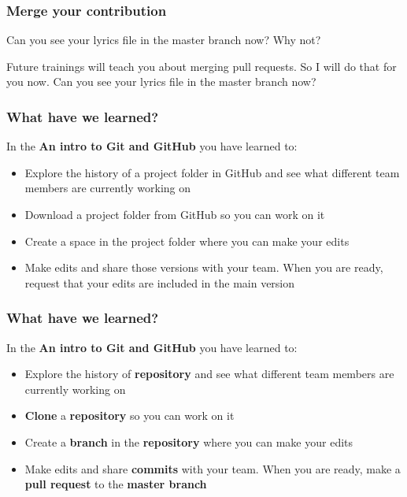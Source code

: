 \documentclass[aspectratio=169]{beamer} %
\begin{document}
\begin{frame}
\frametitle{Merge your contribution}

Can you see your lyrics file in the master branch now? Why not?

\vspace{.5cm}

Future trainings will teach you about merging pull requests. So I will do that for you now. Can you see your lyrics file in the master branch now?

\end{frame}



\begin{frame}
\frametitle{What have we learned?}
	
	In the \textbf{An intro to Git and GitHub} you have learned to:
	
	\begin{itemize}
		\item Explore the history of a project folder in GitHub and see what different team members are currently working on
		\item Download a project folder from GitHub so you can work on it
		\item Create a space in the project folder where you can make your edits
		\item Make edits and share those versions with your team. When you are ready, request that your edits are included in the main version
	\end{itemize}

\end{frame}

\begin{frame}
\frametitle{What have we learned?}

	In the \textbf{An intro to Git and GitHub} you have learned to:
	
	\begin{itemize}
		\item Explore the history of \textbf{repository} and see what different team members are currently working on
		\item \textbf{Clone} a \textbf{repository} so you can work on it
		\item Create a \textbf{branch} in the \textbf{repository} where you can make your edits
		\item Make edits and share \textbf{commits} with your team. When you are ready, make a \textbf{pull request} to the \textbf{master branch}
	\end{itemize}
\end{frame}
\end{document}
